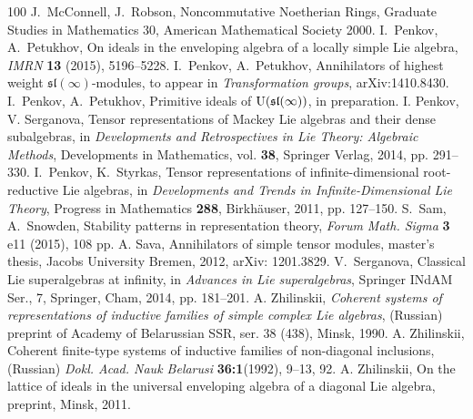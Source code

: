 \documentclass{emsprocart}
\begin{document}
\begin{thebibliography}{100}
 J.~McConnell, J.~Robson, Noncommutative Noetherian Rings, Graduate Studies in Mathematics 30, American Mathematical Society 2000.
 I.~Penkov, A.~Petukhov, On ideals in the enveloping algebra of a locally simple Lie algebra, {\it IMRN} {\bf 13} (2015), 5196--5228.
 I.~Penkov, A.~Petukhov, Annihilators of highest weight $\mathfrak{sl}(\infty)$-modules, to appear in {\it Transformation groups}, arXiv:1410.8430.
 I.~Penkov, A.~Petukhov, Primitive ideals of $\operatorname{U}(\frak{sl}(\infty))$, in preparation.
  I. Penkov, V. Serganova, Tensor representations of Mackey Lie algebras and their dense subalgebras, in {\it Developments and Retrospectives in Lie Theory: Algebraic Methods}, Developments in Mathematics, vol. {\bf 38}, Springer Verlag, 2014, pp. 291--330.
 I.~Penkov, K.~Styrkas, Tensor representations of infinite-dimensional root-reductive Lie algebras, in {\it Developments and Trends in Infinite-Dimensional Lie Theory}, Progress in Mathematics {\bf 288}, Birkh\"auser, 2011, pp. 127--150.
 S.~Sam, A.~Snowden, Stability patterns in representation theory, {\it Forum Math. Sigma} {\bf 3} e11 (2015), 108 pp.
 A. Sava, Annihilators of simple tensor modules, master's thesis, Jacobs University Bremen, 2012, arXiv: 1201.3829.
 V.~Serganova, Classical Lie superalgebras at infinity, in {\it Advances in Lie superalgebras}, Springer INdAM Ser., 7, Springer, Cham, 2014, pp. 181--201.
 A. Zhilinskii, {\it Coherent systems of representations of inductive families of simple complex Lie algebras}, (Russian) preprint of Academy of Belarussian SSR, ser. 38 (438), Minsk, 1990.
 A. Zhilinskii, Coherent finite-type systems of inductive families of non-diagonal inclusions, (Russian) {\it Dokl. Acad. Nauk Belarusi} {\bf 36:1}(1992), 9--13, 92.
 A. Zhilinskii, On the lattice of ideals in the universal enveloping algebra of a diagonal Lie algebra, preprint, Minsk, 2011.
\end{thebibliography}
\end{document}
